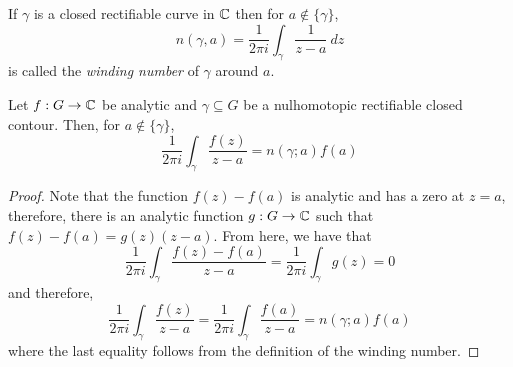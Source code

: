 \begin{definition}
    If $\gamma$ is a closed rectifiable curve in $\mathbb{C}$ then for $a\notin\{\gamma\}$, 
    \begin{equation*}
        n(\gamma, a) = \frac{1}{2\pi i}\int_\gamma\frac{1}{z - a}~dz
    \end{equation*}
    is called the \textit{winding number} of $\gamma$ around $a$.
\end{definition}

\begin{theorem}
    Let $f: G\to\mathbb{C}$ be analytic and $\gamma\subseteq G$ be a nulhomotopic rectifiable closed contour. Then, for $a\notin\{\gamma\}$,
    \begin{equation*}
        \frac{1}{2\pi i}\int_{\gamma}\frac{f(z)}{z - a} = n(\gamma;a)f(a)
    \end{equation*}
\end{theorem}
\begin{proof}
    Note that the function $f(z) - f(a)$ is analytic and has a zero at $z = a$, therefore, there is an analytic function $g: G\to\mathbb{C}$ such that $f(z) - f(a) = g(z)(z - a)$. From here, we have that 
    \begin{equation*}
        \frac{1}{2\pi i}\int_\gamma\frac{f(z) - f(a)}{z - a} = \frac{1}{2\pi i}\int_{\gamma}g(z) = 0
    \end{equation*}
    and therefore, 
    \begin{equation*}
        \frac{1}{2\pi i}\int_{\gamma}\frac{f(z)}{z - a} = \frac{1}{2\pi i}\int_{\gamma}\frac{f(a)}{z - a} = n(\gamma;a)f(a)
    \end{equation*}
    where the last equality follows from the definition of the winding number.
\end{proof}

